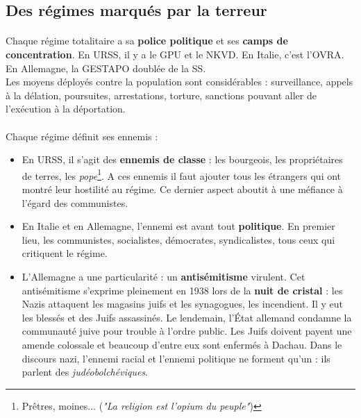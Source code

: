 \documentclass[12pt]{article}
\renewcommand{\emph}{\textbf}
\begin{document}
\subsection{Des régimes marqués par la terreur}

\paragraph{}
Chaque régime totalitaire a sa \emph{police politique} et ses \emph{camps de concentration}. En URSS, il y a le GPU et le NKVD. En Italie, c'est l'OVRA. En Allemagne, la GESTAPO doublée de la SS.\\
Les moyens déployés contre la population sont considérables : surveillance, appels à la délation, poursuites, arrestations, torture, sanctions pouvant aller de l'exécution à la déportation.

\paragraph{}
Chaque régime définit ses ennemis :
\begin{itemize}
\item En URSS, il s'agit des \emph{ennemis de classe} : les bourgeois, les propriétaires de terres, les \textit{pope}\footnote{Prêtres, moines... (\textit{"La religion est l'opium du peuple"})}. A ces ennemis il faut ajouter tous les étrangers qui ont montré leur hostilité au régime. Ce dernier aspect aboutit à une méfiance à l'égard des communistes.
\item En Italie et en Allemagne, l'ennemi est avant tout \emph{politique}. En premier lieu, les communistes, socialistes, démocrates, syndicalistes, tous ceux qui critiquent le régime.
\item L'Allemagne a une particularité : un \emph{antisémitisme} virulent. Cet antisémitisme s'exprime pleinement en 1938 lors de la \emph{nuit de cristal} : les Nazis attaquent les magasins juifs et les synagogues, les incendient. Il y eut les blessés et des Juifs assassinés. Le lendemain, l'État allemand condamne la communauté juive pour trouble à l'ordre public. Les Juifs doivent payent une amende colossale et beaucoup d'entre eux sont enfermés à Dachau. Dans le discours nazi, l'ennemi racial et l'ennemi politique ne forment qu'un : ils parlent des \textit{judéobolchéviques}.
\end{itemize}
\end{document}
